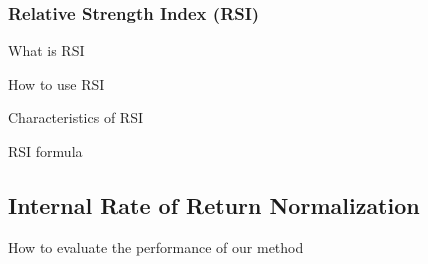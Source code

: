 \documentclass[../main.tex]{subfiles}
\begin{document}
\subsubsection{Relative Strength Index (RSI)}
What is RSI

How to use RSI

Characteristics of RSI

RSI formula





\subsection{Internal Rate of Return Normalization}
How to evaluate the performance of our method
\end{document}
